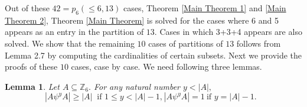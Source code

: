 \documentclass[reqno,10pt]{amsart}
\newtheorem{lem}[prop]{ Lemma}
\newtheorem{remar}[prop]{Remark}
\begin{document}
 Out of these $42 = p_6(\leq 6, 13)$ cases, Theorem \ref{Main Theorem 1} and \ref{Main Theorem 2}, Theorem \ref{Main Theorem} is solved for the cases where 6 and 5 appears as an entry in the partition of $13.$ Cases in which 3+3+4 appears are also solved.  We show that the remaining $10$ cases of partitions of $13$ follows from Lemma 2.7 by computing the cardinalities of certain subsets. Next we provide the proofs of these $10$ cases, case by case. We need following three lemmas.
\begin{lem} 
\label{lp-sp}Let $A\subseteq  \mathbb{Z}_{6}.$ For any natural number $y < |A|,$
$$ | A \psi^y A | \geq |A|  \  \text{ if $1 \leq y < |A|-1$,} \
 | A \psi^y A | = 1 \  \text{if $y = |A|-1.$ }$$ 
\end{lem}
\end{document}
